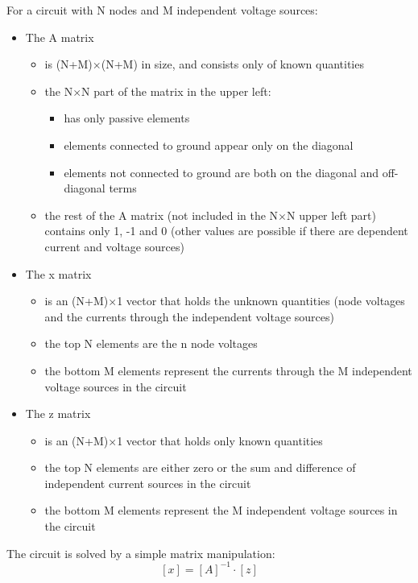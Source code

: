 For a circuit with N nodes and M independent voltage sources:

\begin{itemize}

\item The A matrix
\begin{itemize}
\item
is (N+M)$\times$(N+M) in size, and consists only of known quantities
\item
the N$\times$N part of the matrix in the upper left:
\begin{itemize}
\item
has only passive elements
\item
elements connected to ground appear only on the diagonal
\item
elements not connected to ground are both on the diagonal and
off-diagonal terms
\end{itemize}
\item
the rest of the A matrix (not included in the N$\times$N upper left
part) contains only 1, -1 and 0 (other values are possible if there
are dependent current and voltage sources)
\end{itemize}

\item The x matrix
\begin{itemize}
\item
is an (N+M)$\times$1 vector that holds the unknown quantities (node
voltages and the currents through the independent voltage sources)
\item
the top N elements are the n node voltages
\item
the bottom M elements represent the currents through the M independent
voltage sources in the circuit
\end{itemize}

\item The z matrix
\begin{itemize}
\item
is an (N+M)$\times$1 vector that holds only known quantities
\item
the top N elements are either zero or the sum and difference of
independent current sources in the circuit
\item
the bottom M elements represent the M independent voltage sources in
the circuit
\end{itemize}
\end{itemize}

The circuit is solved by a simple matrix manipulation:
\begin{equation}
\left[x\right] = \left[A\right]^{-1} \cdot \left[z\right]
\end{equation}


